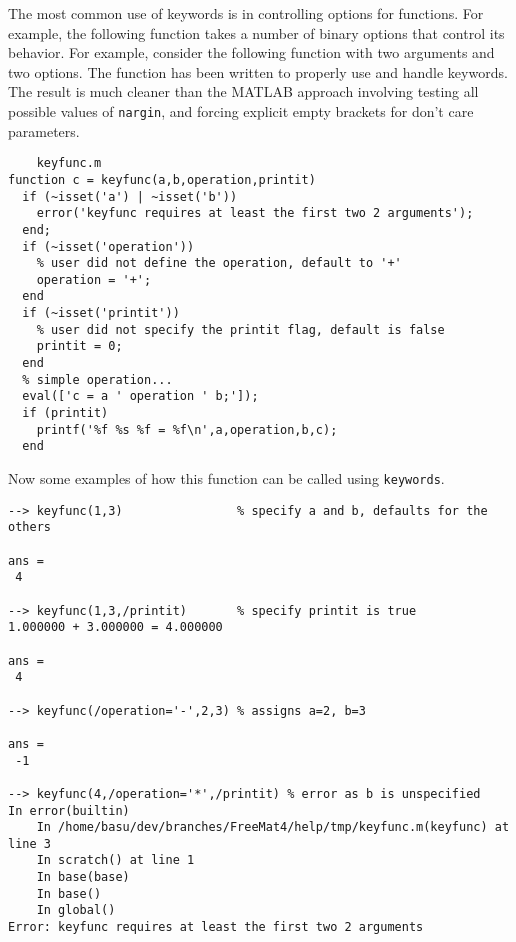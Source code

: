 The most common use of keywords is in controlling options for
functions.  For example, the following function takes a number
of binary options that control its behavior.  For example,
consider the following function with two arguments and two
options.  The function has been written to properly use and
handle keywords.  The result is much cleaner than the MATLAB
approach involving testing all possible values of \verb|nargin|,
and forcing explicit empty brackets for don't care parameters.
\begin{verbatim}
    keyfunc.m
function c = keyfunc(a,b,operation,printit)
  if (~isset('a') | ~isset('b')) 
    error('keyfunc requires at least the first two 2 arguments'); 
  end;
  if (~isset('operation'))
    % user did not define the operation, default to '+'
    operation = '+';
  end
  if (~isset('printit'))
    % user did not specify the printit flag, default is false
    printit = 0;
  end
  % simple operation...
  eval(['c = a ' operation ' b;']);
  if (printit) 
    printf('%f %s %f = %f\n',a,operation,b,c);
  end
\end{verbatim}
Now some examples of how this function can be called using
\verb|keywords|.
\begin{verbatim}
--> keyfunc(1,3)                % specify a and b, defaults for the others

ans = 
 4 

--> keyfunc(1,3,/printit)       % specify printit is true
1.000000 + 3.000000 = 4.000000

ans = 
 4 

--> keyfunc(/operation='-',2,3) % assigns a=2, b=3

ans = 
 -1 

--> keyfunc(4,/operation='*',/printit) % error as b is unspecified
In error(builtin)
    In /home/basu/dev/branches/FreeMat4/help/tmp/keyfunc.m(keyfunc) at line 3
    In scratch() at line 1
    In base(base)
    In base()
    In global()
Error: keyfunc requires at least the first two 2 arguments
\end{verbatim}
